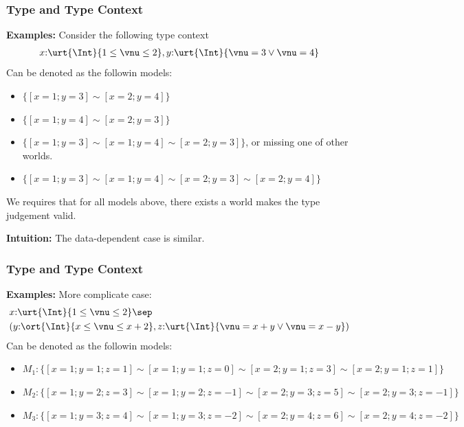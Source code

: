 \begin{frame}[fragile]
    \frametitle{Type and Type Context}

\textbf{Examples:} Consider the following type context
\begin{align*}
    x{:}\urt{\Int}{1 \leq \vnu \leq 2}, y{:}\urt{\Int}{\vnu = 3 \lor \vnu = 4}
\end{align*}\noindent
Can be denoted as the followin models:
\begin{itemize}
    \item $\{[x=1;y=3] \sim [x=2;y=4]\}$
    \item $\{[x=1;y=4] \sim [x=2;y=3]\}$
    \item $\{[x=1;y=3] \sim [x=1;y=4] \sim [x=2;y=3]\}$, or missing one of other worlds.
    \item $\{[x=1;y=3] \sim [x=1;y=4] \sim [x=2;y=3] \sim [x=2;y=4]\}$
\end{itemize}
We requires that for all models above, there exists a world makes the type judgement valid.

\textbf{Intuition:} The data-dependent case is similar.
\end{frame}

\begin{frame}[fragile]
    \frametitle{Type and Type Context}

\textbf{Examples:} More complicate case:
\begin{align*}
    &x{:}\urt{\Int}{1 \leq \vnu \leq 2} \sep 
    \\&(y{:}\ort{\Int}{x \leq \vnu \leq x + 2}, z{:}\urt{\Int}{\vnu = x + y \lor \vnu = x - y})
\end{align*}\noindent
Can be denoted as the followin models:
{\small
\begin{itemize}
    \item $M_1: \{[x=1;y=1;z=1] \sim [x=1;y=1;z=0] \sim  [x=2;y=1;z=3]  \sim [x=2;y=1;z=1] \}$
    \item $M_2: \{[x=1;y=2;z=3] \sim [x=1;y=2;z=-1] \sim  [x=2;y=3;z=5]  \sim [x=2;y=3;z=-1] \}$
    \item $M_3: \{[x=1;y=3;z=4] \sim [x=1;y=3;z=-2] \sim  [x=2;y=4;z=6]  \sim [x=2;y=4;z=-2] \}$
\end{itemize}}

\end{frame}

